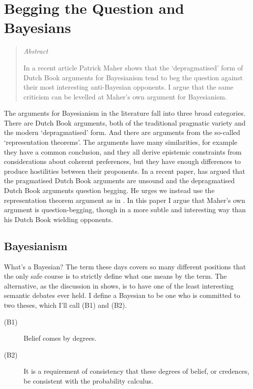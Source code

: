 \chapter[Begging the Question and Bayesians]{Begging the Question and Bayesians}


\begin{quote}
{\itshape
Abstract}

\noindent In a recent article Patrick Maher shows that the `depragmatised' form of Dutch Book arguments for Bayesianism tend to beg the question against their most interesting anti-Bayesian opponents. I argue that the same criticism can be levelled at Maher's own argument for Bayesianism.
\end{quote}

\noindent The arguments for Bayesianism in the literature fall into three broad categories. There are Dutch Book arguments, both of the traditional pragmatic variety and the modern `depragmatised' form. And there are arguments from the so-called `representation theorems'. The arguments have many similarities, for example they have a common conclusion, and they all derive epistemic constraints from considerations about coherent preferences, but they have enough differences to produce hostilities between their proponents. In a recent paper, \citet{Maher1997} has argued that the pragmatised Dutch Book arguments are unsound and the depragmatised Dutch Book arguments question begging. He urges we instead use the representation theorem argument as in \citet{Maher1993}. In this paper I argue that Maher's own argument is question-begging, though in a more subtle and interesting way than his Dutch Book wielding opponents. 

\section[Bayesianism]{Bayesianism}
What's a Bayesian? The term these days covers so many different positions that the only safe course is to strictly define what one means by the term. The alternative, as the discussion in \citet{Walley1996} shows, is to have one of the least interesting semantic debates ever held. I define a Bayesian to be one who is committed to two theses, which I'll call (B1) and (B2).

\begin{description}
\item[(B1)] Belief comes by degrees.
\item[(B2)] It is a requirement of consistency that these degrees of belief, or credences, be consistent with the probability calculus.
\end{description}

